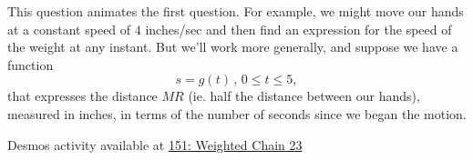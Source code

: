 \documentclass{ximera}
\begin{document}
\begin{question}  \label{Q:DFDFGGtg}
This question animates the first question. For example, we might move our hands at a constant speed of $4$ inches/sec and then find an expression for the speed of the weight at any instant. But we'll work more generally, and suppose we have a function
\[
   s = g(t) \, , \, 0\leq t \leq 5,
\]
that expresses the distance $MR$ (ie. half the distance between our hands), measured in inches, in terms of the number of seconds since we began the motion.

\begin{onlineOnly}
    \begin{center}
\end{center}
\end{onlineOnly}

Desmos activity available at \href{https://www.desmos.com/calculator/0cmsododxk}{151: Weighted Chain 23}

\end{question}
\end{document}
